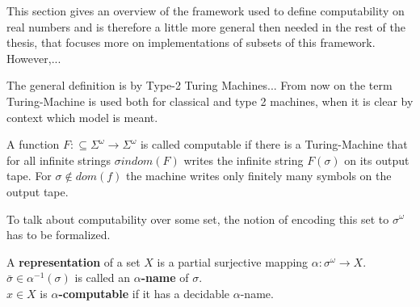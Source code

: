 This section gives an overview of the framework used to define computability on real numbers and is therefore 
a little more general then needed in the rest of the thesis, that focuses more on implementations of subsets of this framework.
However,...

The general definition is by Type-2 Turing Machines...
From now on the term Turing-Machine is used both for classical and type 2 machines, when it is clear by context which model is meant.
\begin{definition}\label{def:computability_ttt}
A function $F:\subseteq \Sigma^\omega \to \Sigma^\omega$ is called computable if there is a Turing-Machine  
that for all infinite strings $\sigma in dom(F)$ writes the infinite string $F(\sigma)$ on its output tape. 
For $\sigma \not \in dom(f)$ the machine writes only finitely many symbols on the output tape.  
\end{definition}
To talk about computability over some set, the notion of encoding this set to $\sigma^\omega$ has to be formalized.
\begin{definition}\label{def:representation}
	A \textbf{representation} of a set $X$ is a partial surjective mapping $\alpha: \sigma^\omega \to X$. \\
	$\bar \sigma \in \alpha^{-1}(\sigma)$ is called an \textbf{$\alpha$-name} of $\sigma$. \\
	$x \in X$ is \textbf{$\alpha$-computable} if it has a decidable $\alpha$-name.
\end{definition}

